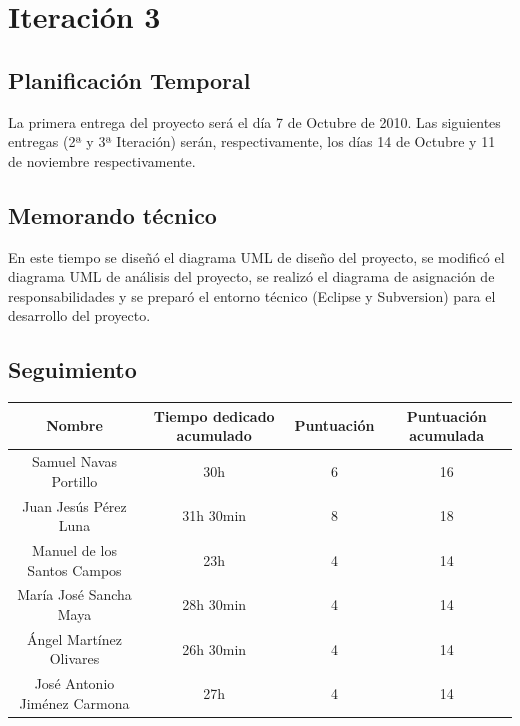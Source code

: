 \documentclass[11 pt]{book}
\begin{document}
\chapter{Iteración 3}
	\section{Planificación Temporal}
		La primera entrega del proyecto será el día 7 de Octubre de 2010. Las siguientes entregas (2ª y 3ª Iteración) serán, respectivamente, los días 14 de Octubre y 11 de noviembre respectivamente.
		
	\section{Memorando técnico}
		En este tiempo se diseñó el diagrama UML de diseño del proyecto, se modificó el diagrama UML de análisis del proyecto, se realizó el diagrama de asignación de responsabilidades y se preparó el entorno técnico (Eclipse y Subversion) para el desarrollo del proyecto.

	\section{Seguimiento}
		\begin{tabular}{|c|c|c|c|}
			\hline
			Nombre & Tiempo dedicado acumulado & Puntuación & Puntuación acumulada\\
			\hline
			Samuel Navas Portillo & 30h & 6 & 16\\
			Juan Jesús Pérez Luna & 31h 30min & 8 & 18\\
			Manuel de los Santos Campos & 23h & 4 & 14\\
			María José Sancha Maya & 28h 30min & 4 & 14\\
			Ángel Martínez Olivares & 26h 30min & 4 & 14\\
			José Antonio Jiménez Carmona & 27h & 4 & 14\\
			\hline
		\end{tabular}
\end{document}

